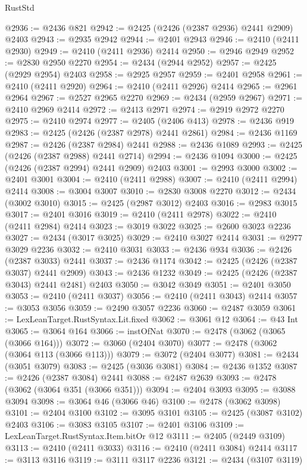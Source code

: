\begin{lexlean}{RustStd}
\begin{coremodule}
@2936 := @2436 @821
@2942 := @2425 (@2426 (@2387 @2936) @2441 @2909) @2403
@2943 := @2935 @2942
@2944 := @2401 @2943
@2946 := @2410 (@2411 @2930)
@2949 := @2410 (@2411 @2936) @2414
@2950 := @2946 @2949
@2952 := @2830 @2950 @2270
@2954 := @2434 (@2944 @2952)
@2957 := @2425 (@2929 @2954) @2403
@2958 := @2925 @2957
@2959 := @2401 @2958
@2961 := @2410 (@2411 @2920)
@2964 := @2410 (@2411 @2926) @2414
@2965 := @2961 @2964
@2967 := @2527 @2965 @2270
@2969 := @2434 (@2959 @2967)
@2971 := @2410 @2969 @2414
@2972 := @2413 @2971
@2974 := @2919 @2972 @2270
@2975 := @2410 @2974
@2977 := @2405 (@2406 @413)
@2978 := @2436 @919
@2983 := @2425 (@2426 (@2387 @2978) @2441 @2861)
@2984 := @2436 @1169
@2987 := @2426 (@2387 @2984) @2441
@2988 := @2436 @1089
@2993 := @2425 (@2426 (@2387 @2988) @2441 @2714)
@2994 := @2436 @1094
@3000 := @2425 (@2426 (@2387 @2994) @2441 @2909) @2403
@3001 := @2993 @3000
@3002 := @2401 @3001
@3004 := @2410 (@2411 @2988)
@3007 := @2410 (@2411 @2994) @2414
@3008 := @3004 @3007
@3010 := @2830 @3008 @2270
@3012 := @2434 (@3002 @3010)
@3015 := @2425 (@2987 @3012) @2403
@3016 := @2983 @3015
@3017 := @2401 @3016
@3019 := @2410 (@2411 @2978)
@3022 := @2410 (@2411 @2984) @2414
@3023 := @3019 @3022
@3025 := @2600 @3023 @2236
@3027 := @2434 (@3017 @3025)
@3029 := @2410 @3027 @2414
@3031 := @2977 @3029 @2236
@3032 := @2410 @3031
@3033 := @2436 @934
@3036 := @2426 (@2387 @3033) @2441
@3037 := @2436 @1174
@3042 := @2425 (@2426 (@2387 @3037) @2441 @2909)
@3043 := @2436 @1232
@3049 := @2425 (@2426 (@2387 @3043) @2441 @2481) @2403
@3050 := @3042 @3049
@3051 := @2401 @3050
@3053 := @2410 (@2411 @3037)
@3056 := @2410 (@2411 @3043) @2414
@3057 := @3053 @3056
@3059 := @2490 @3057 @2236
@3060 := @2487 @3059
@3061 := LexLeanTarget.RustSyntax.Lit.fixed
@3062 := @3061 @12
@3064 := @43 Int
@3065 := @3064 @164
@3066 := instOfNat
@3070 := @2478 (@3062 (@3065 (@3066 @164)))
@3072 := @3060 (@2404 @3070)
@3077 := @2478 (@3062 (@3064 @113 (@3066 @113)))
@3079 := @3072 (@2404 @3077)
@3081 := @2434 (@3051 @3079)
@3083 := @2425 (@3036 @3081)
@3084 := @2436 @1352
@3087 := @2426 (@2387 @3084) @2441
@3088 := @2487 @2639
@3093 := @2478 (@3062 (@3064 @351 (@3066 @351)))
@3094 := @2404 @3093
@3095 := @3088 @3094
@3098 := @3064 @46 (@3066 @46)
@3100 := @2478 (@3062 @3098)
@3101 := @2404 @3100
@3102 := @3095 @3101
@3105 := @2425 (@3087 @3102) @2403
@3106 := @3083 @3105
@3107 := @2401 @3106
@3109 := LexLeanTarget.RustSyntax.Item.bitOr @12
@3111 := @2405 (@2449 @3109)
@3113 := @2410 (@2411 @3033)
@3116 := @2410 (@2411 @3084) @2414
@3117 := @3113 @3116
@3119 := @3111 @3117 @2236
@3121 := @2434 (@3107 @3119)

\end{coremodule}
\end{lexlean}
